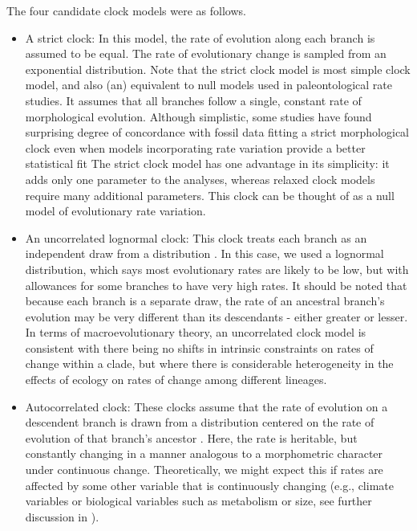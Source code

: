 \documentclass{article}
\begin{document}
The four candidate clock models were as follows.
\begin{itemize}
    \item A strict clock: In this model, the rate of evolution along each branch is assumed to be equal. The rate of evolutionary change is sampled from an exponential distribution. 
    Note that the strict clock model is most simple clock model, and also (an) equivalent to null models used in paleontological rate studies. 
    It assumes that all branches follow a single, constant rate of morphological evolution. 
    Although simplistic, some studies have found surprising degree of concordance with fossil data fitting a strict morphological clock even when models incorporating rate variation provide a better statistical fit \citep{Drummond2016, Wright2017jp}
    The strict clock model has one advantage in its simplicity: it adds only one parameter to the analyses, whereas relaxed clock models require many additional parameters.
    This clock can be thought of as a null model of evolutionary rate variation.
    \item An uncorrelated lognormal clock: This clock treats each branch as an independent draw from a distribution \citep{Drummond2006, Drummond2007}.  
    In this case, we used a lognormal distribution, which says most evolutionary rates are likely to be low, but with allowances for some branches to have very high rates. 
    It should be noted that because each branch is a separate draw, the rate of an ancestral branch's evolution may be very different than its descendants - either greater or lesser.  In terms of macroevolutionary theory, an uncorrelated clock model is consistent with there being no shifts in intrinsic constraints on rates of change within a clade, but where there is considerable heterogeneity in the effects of ecology on rates of change among different lineages.  
    \item Autocorrelated clock: These clocks assume that the rate of evolution on a descendent branch is drawn from a distribution centered on the rate of evolution of that branch's ancestor \citep{Aris-Brosou2002}.  Here, the rate is heritable, but constantly changing in a manner analogous to a morphometric character under continuous change.  Theoretically, we might expect this if rates are affected by some other variable that is continuously changing (e.g., climate variables or biological variables such as metabolism or size, see further discussion in \cite{bromham1996, gaut1992,thomas2006,bromham2015}).  %

\end{itemize}
\end{document}
